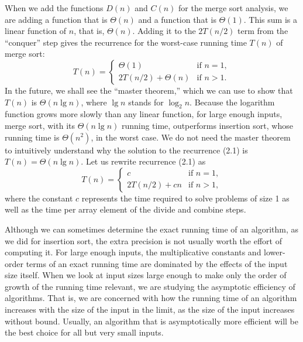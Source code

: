 \documentclass{report}
\begin{document}
        When we add the functions $D(n)$ and $C(n)$ for the merge sort analysis, we are 
        adding a function that is $\Theta(n)$ and a function that is $\Theta(1)$. This sum is a linear 
        function of $n$, that is, $\Theta(n)$. Adding it to the $2T(n/2)$ term from the ``conquer'' 
        step gives the recurrence for the worst-case running time $T(n)$ of merge sort:
        \[
            T(n) =
            \begin{cases}
                \Theta(1) & \text{if } n = 1 , \\
                2T(n/2) + \Theta(n) & \text{if } n > 1 .
            \end{cases} \tag{2.1}
        \]
        In the future, we shall see the ``master theorem,'' which we can use to show 
        that $T(n)$ is $\Theta(n \lg n)$, where $\lg n$ stands for $\log_2 n$. Because the logarithm 
        function grows more slowly than any linear function, for large enough inputs, merge 
        sort, with its $\Theta(n \lg n)$ running time, outperforms insertion sort, whose running 
        time is $\Theta(n^2)$, in the worst case.
        \bigbreak \noindent 
        We do not need the master theorem to intuitively understand why the solution to 
        the recurrence (2.1) is $T(n) = \Theta(n \lg n)$. Let us rewrite recurrence (2.1) as
        \[
            T(n) =
            \begin{cases}
                c & \text{if } n = 1 , \\
                2T(n/2) + cn & \text{if } n > 1 ,
            \end{cases} \tag{2.2}
        \]
        where the constant $c$ represents the time required to solve problems of size 1 as 
        well as the time per array element of the divide and combine steps.
        \bigbreak \noindent 
        \bigbreak \noindent 


        \pagebreak 
        \bigbreak \noindent 
        Although we can sometimes determine the exact running time of an algorithm, as we did for insertion sort, the extra precision is not usually worth the effort of computing it. For large enough inputs, the multiplicative constants and lower-order terms of an exact running time are dominated by the effects of the input size itself.
        \bigbreak \noindent 
        When we look at input sizes large enough to make only the order of growth of the running time relevant, we are studying the asymptotic efficiency of algorithms. That is, we are concerned with how the running time of an algorithm increases with the size of the input in the limit, as the size of the input increases without bound. Usually, an algorithm that is asymptotically more efficient will be the best choice for all but very small inputs.
        \bigbreak \noindent 
\end{document}
